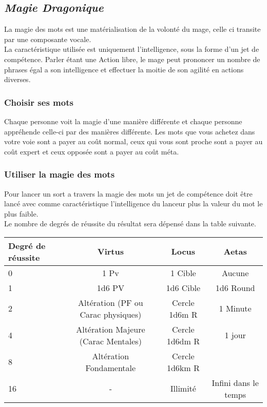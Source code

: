 \subsection{\em Magie Dragonique}

La magie des mots est une matérialisation de la volonté du mage, celle ci transite par une composante vocale.\\
La caractéristique utilisée est uniquement l'intelligence, sous la forme d’un jet de compétence. 
Parler étant une Action libre, le mage peut prononcer un nombre de phrases égal a son intelligence et effectuer la moitie de son agilité en actions diverses.

\subsubsection{Choisir ses mots}
Chaque personne voit la magie d’une manière différente et chaque personne appréhende celle-ci par des manières différente.
Les mots que vous achetez dans votre voie sont a payer au coût normal, 
ceux qui vous sont proche sont a payer au coût expert et ceux opposée sont a payer au coût méta.
\subsubsection{Utiliser la magie des mots}
Pour lancer un sort a travers la magie des mots un jet de compétence doit être lancé avec comme caractéristique 
l’intelligence du lanceur plus la valeur du mot le plus faible.\\
Le nombre de degrés de réussite du résultat sera dépensé dans la table suivante.
\begin{center}
\begin{tabular}{||l|c|c|c||}
    \hline
    Degré de réussite &     Virtus & Locus & Aetas\\
    \hline
    0                 & 1 Pv       & 1 Cible & Aucune \\
    1                 & 1d6 PV     & 1d6 Cible & 1d6 Round \\
    2   & Altération (PF ou Carac physiques) & Cercle 1d6m R &   1 Minute\\
    4   & Altération Majeure (Carac Mentales)& Cercle 1d6dm R &   1 jour\\
    8   & Altération Fondamentale  &   Cercle 1d6km R & \\  
    16                &  -         & Illimité&  Infini dans le temps\\
    \hline
\end{tabular}
\end{center}

